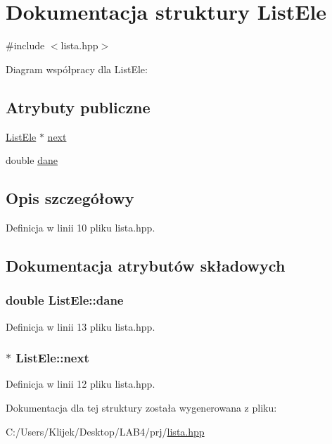 \hypertarget{struct_list_ele}{\section{Dokumentacja struktury List\-Ele}
\label{struct_list_ele}
}


{\ttfamily \#include $<$lista.\-hpp$>$}



Diagram współpracy dla List\-Ele\-:
\subsection*{Atrybuty publiczne}
\begin{DoxyCompactItemize}
\item 
\hyperlink{struct_list_ele}{List\-Ele} $\ast$ \hyperlink{struct_list_ele_a94ce43c22a26ca3da57cdd34cd9005ad}{next}
\item 
double \hyperlink{struct_list_ele_a52bbe3635f6c0d0b095d12b97c0ee55c}{dane}
\end{DoxyCompactItemize}


\subsection{Opis szczegółowy}


Definicja w linii 10 pliku lista.\-hpp.



\subsection{Dokumentacja atrybutów składowych}
\hypertarget{struct_list_ele_a52bbe3635f6c0d0b095d12b97c0ee55c}{
\subsubsection[{dane}]{\setlength{\rightskip}{0pt plus 5cm}double List\-Ele\-::dane}}\label{struct_list_ele_a52bbe3635f6c0d0b095d12b97c0ee55c}


Definicja w linii 13 pliku lista.\-hpp.

\hypertarget{struct_list_ele_a94ce43c22a26ca3da57cdd34cd9005ad}{
\subsubsection[{next}]{$\ast$ List\-Ele\-::next}}\label{struct_list_ele_a94ce43c22a26ca3da57cdd34cd9005ad}


Definicja w linii 12 pliku lista.\-hpp.



Dokumentacja dla tej struktury została wygenerowana z pliku\-:\begin{DoxyCompactItemize}
\item 
C\-:/\-Users/\-Klijek/\-Desktop/\-L\-A\-B4/prj/\hyperlink{lista_8hpp}{lista.\-hpp}\end{DoxyCompactItemize}
